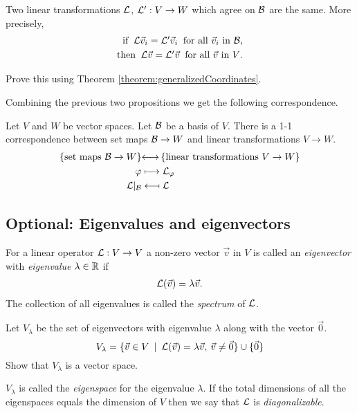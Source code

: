 \begin{proposition}
  Two linear transformations $\mathcal{L}$, $\mathcal{L}': V \rightarrow W$ which agree on $\mathcal{B}$ are the same. More precisely,
  \begin{align*}
    \mbox{if $\:\mathcal{L} \vec{v}_i = \mathcal{L}' \vec{v}_i\:$ for all $\vec{v}_i$ in $\mathcal{B}$,}\\ \mbox{then $\:\mathcal{L} \vec{v} = \mathcal{L}' \vec{v}\:$ for all $\vec{v}$ in $V$.}
  \end{align*}
\end{proposition}
\begin{qbox}
  Prove this using Theorem \ref{theorem:generalizedCoordinates}.
\end{qbox}

Combining the previous two propositions we get the following correspondence.
\begin{theorem}
  Let $V$ and $W$ be vector spaces. Let $\mathcal{B}$ be a basis of $V$.
  There is a 1-1 correspondence between set maps $\mathcal{B} \rightarrow W$ and linear transformations $V \rightarrow W$.
  \begin{align*}
    \left\{\mbox{set maps $\mathcal{B} \rightarrow W$}\right\}
    &{\longleftrightarrow}
    \left\{\mbox{linear transformations $V \rightarrow W$}\right\} \\
    \varphi &\longmapsto \mathcal{L}_\varphi \\
    \mathcal{L}|_{\mathcal{B}} &\longmapsfrom \mathcal{L}
  \end{align*}
\end{theorem}











\subsection{Optional: Eigenvalues and eigenvectors}
\begin{definition}
  For a linear operator $\mathcal{L}: V \rightarrow V$ a non-zero vector $\vec{v}$ in $V$ is called an \emph{eigenvector} with \emph{eigenvalue} $\lambda \in \mathbb{R}$ if
  \begin{align*}
    \mathcal{L} (\vec{v}) = \lambda \vec{v}.
  \end{align*}
  The collection of all eigenvalues is called the \emph{spectrum} of $\mathcal{L}$.
\end{definition}

\begin{qbox}
  Let $V_\lambda$ be the set of eigenvectors with eigenvalue $\lambda$ along with the vector $\vec{0}$.
  \begin{equation*}
    V_\lambda = \{ \vec{v} \in V \: \mid \: \mathcal{L} (\vec{v}) = \lambda \vec{v}, \: \vec{v} \neq \vec{0}\} \cup \{ \vec{0}\}
  \end{equation*}
  Show that $V_\lambda$ is a vector space.
\end{qbox}
$V_\lambda$ is called the \emph{eigenspace} for the eigenvalue $\lambda$.
If the total dimensions of all the eigenspaces equals the dimension of $V$ then we say that $\mathcal{L}$ is \emph{diagonalizable}.

